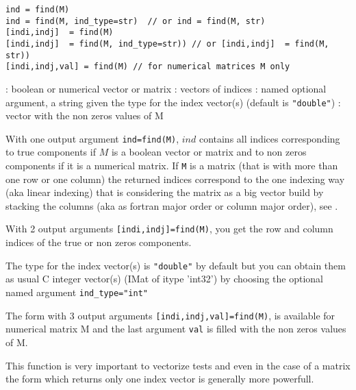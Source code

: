 
\begin{mandesc}
\end{mandesc}

\begin{calling_sequence}
\begin{verbatim}
ind = find(M)
ind = find(M, ind_type=str)  // or ind = find(M, str)
[indi,indj]  = find(M)
[indi,indj]  = find(M, ind_type=str)) // or [indi,indj]  = find(M, str))
[indi,indj,val] = find(M) // for numerical matrices M only
\end{verbatim}
\end{calling_sequence}
\begin{parameters}
  \begin{varlist}
    :  boolean or  numerical vector or matrix
    : vectors of indices
    : named optional argument, a string given the type for the index vector(s) (default is \verb+"double"+)
    : vector with the non zeros values of M
  \end{varlist}
\end{parameters}

\begin{mandescription}
With one output argument \verb+ind=find(M)+,  $ind$ contains all indices 
corresponding to true components if $M$ is a boolean vector or matrix 
and to non zeros components if it is a numerical matrix. If \verb+M+
is a matrix (that is with more than one row or one
column) the returned indices correspond to the one indexing way (aka
linear indexing)
that is considering the matrix as a big vector build by stacking 
the columns (aka as fortran major order or column major order),
see .

With 2 output arguments \verb+[indi,indj]=find(M)+,
you get the  row and column indices of the true or non zeros components.

The type for the index vector(s) is \verb+"double"+ by default but you
can obtain them as usual C integer vector(s) (IMat of itype 'int32') 
by choosing the optional named argument \verb+ind_type="int"+

The form with 3 output arguments \verb+[indi,indj,val]=find(M)+, is available
for numerical matrix M and the last argument \verb+val+ is filled with
the non zeros values of M.


This function is very important to vectorize tests and even in the 
case of a matrix the form which returns only one 
index vector is generally more powerfull.
\end{mandescription}

